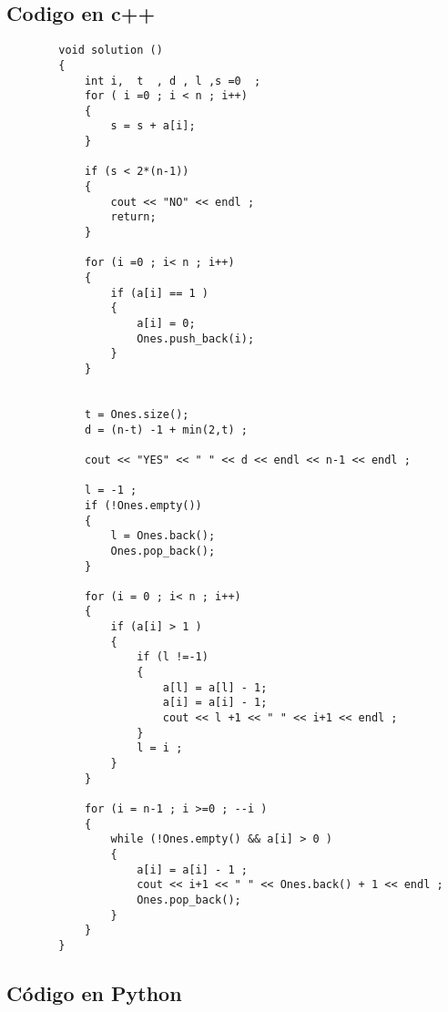 \documentclass[10pt]{article}
\begin{document}
    \subsection{Codigo en c++ } 

    \begin{verbatim}
        void solution () 
        {
            int i,  t  , d , l ,s =0  ; 
            for ( i =0 ; i < n ; i++) 
            {
                s = s + a[i]; 
            }

            if (s < 2*(n-1)) 
            {
                cout << "NO" << endl ; 
                return; 
            }

            for (i =0 ; i< n ; i++)
            {
                if (a[i] == 1 )
                {
                    a[i] = 0; 
                    Ones.push_back(i);
                }
            }


            t = Ones.size(); 
            d = (n-t) -1 + min(2,t) ; 

            cout << "YES" << " " << d << endl << n-1 << endl ; 

            l = -1 ; 
            if (!Ones.empty())
            {
                l = Ones.back(); 
                Ones.pop_back(); 
            }

            for (i = 0 ; i< n ; i++)
            {
                if (a[i] > 1 ) 
                {
                    if (l !=-1)
                    {
                        a[l] = a[l] - 1;
                        a[i] = a[i] - 1;
                        cout << l +1 << " " << i+1 << endl ;   
                    }
                    l = i ; 
                }
            }

            for (i = n-1 ; i >=0 ; --i )
            {
                while (!Ones.empty() && a[i] > 0 ) 
                {
                    a[i] = a[i] - 1 ; 
                    cout << i+1 << " " << Ones.back() + 1 << endl ; 
                    Ones.pop_back();   
                }
            }    
        }
    \end{verbatim}


    \subsection{C\'odigo en Python }
\end{document}
